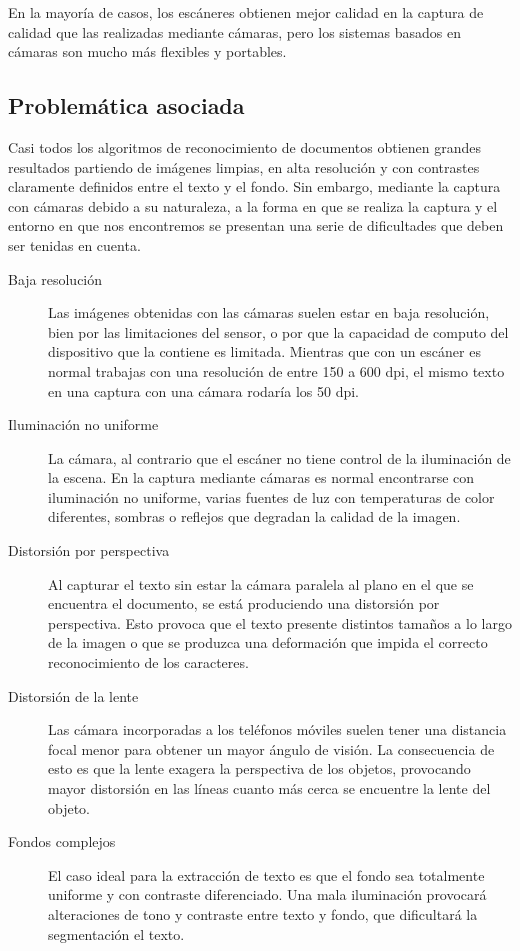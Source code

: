En la mayoría de casos, los escáneres obtienen mejor calidad en la captura de calidad que las realizadas mediante cámaras, pero los sistemas basados en cámaras son mucho más flexibles y portables. 

\subsection{Problemática asociada}
Casi todos los algoritmos de reconocimiento de documentos obtienen grandes resultados partiendo de imágenes limpias, en alta resolución y con contrastes claramente definidos entre el texto y el fondo. Sin embargo, mediante la captura con cámaras debido a su naturaleza, a la forma en que se realiza la captura y el entorno en que nos encontremos se presentan una serie de dificultades que deben ser tenidas en cuenta.  
\begin{description}
\item[Baja resolución] Las imágenes obtenidas con las cámaras suelen estar en baja resolución, bien por las limitaciones del sensor, o por que la capacidad de computo del dispositivo que la contiene es limitada. Mientras que con un escáner es normal trabajas con una resolución de entre 150 a 600 dpi, el mismo texto en una captura con una cámara rodaría los 50 dpi.
\item[Iluminación no uniforme] La cámara, al contrario que el escáner no tiene control de la iluminación de la escena. En la captura mediante cámaras es normal encontrarse con iluminación no uniforme, varias fuentes de luz con temperaturas de color diferentes, sombras o reflejos que degradan la calidad de la imagen.
\item[Distorsión por perspectiva] Al capturar el texto sin estar la cámara paralela al plano en el que se encuentra el documento, se está produciendo una distorsión por perspectiva. Esto provoca que el texto presente distintos tamaños a lo largo de la imagen o que se produzca una deformación que impida el correcto reconocimiento de los caracteres. 
\item[Distorsión de la lente] Las cámara incorporadas a los teléfonos móviles suelen tener una distancia focal menor para obtener un mayor ángulo de visión. La consecuencia de esto es que la lente exagera la perspectiva de los objetos, provocando mayor distorsión en las líneas cuanto más cerca se encuentre la lente del objeto.
\item[Fondos complejos] El caso ideal para la extracción de texto es que el fondo sea totalmente uniforme y con contraste diferenciado. Una mala iluminación provocará alteraciones de tono y contraste entre texto y fondo, que dificultará la segmentación el texto. 

\end{description}
